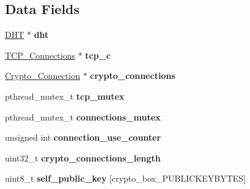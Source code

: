 \subsection*{Data Fields}
\begin{DoxyCompactItemize}
\item 
\hypertarget{struct_net___crypto_a8b3d6ce8745acc52695e252bdb1531b6}{\hyperlink{struct_d_h_t}{D\+H\+T} $\ast$ {\bfseries dht}}\label{struct_net___crypto_a8b3d6ce8745acc52695e252bdb1531b6}

\item 
\hypertarget{struct_net___crypto_a179982a02be89eaf6617ed81bd3c0961}{\hyperlink{struct_t_c_p___connections}{T\+C\+P\+\_\+\+Connections} $\ast$ {\bfseries tcp\+\_\+c}}\label{struct_net___crypto_a179982a02be89eaf6617ed81bd3c0961}

\item 
\hypertarget{struct_net___crypto_a13fdc865b8a114466ba136f5390ec1b2}{\hyperlink{struct_crypto___connection}{Crypto\+\_\+\+Connection} $\ast$ {\bfseries crypto\+\_\+connections}}\label{struct_net___crypto_a13fdc865b8a114466ba136f5390ec1b2}

\item 
\hypertarget{struct_net___crypto_a2e8f7f4dff2f2fc4ac2cc32b0c886974}{pthread\+\_\+mutex\+\_\+t {\bfseries tcp\+\_\+mutex}}\label{struct_net___crypto_a2e8f7f4dff2f2fc4ac2cc32b0c886974}

\item 
\hypertarget{struct_net___crypto_a213135bf3b5b80b1cfe99b27dc42815e}{pthread\+\_\+mutex\+\_\+t {\bfseries connections\+\_\+mutex}}\label{struct_net___crypto_a213135bf3b5b80b1cfe99b27dc42815e}

\item 
\hypertarget{struct_net___crypto_ab5be057850e1cee67902276a69900326}{unsigned int {\bfseries connection\+\_\+use\+\_\+counter}}\label{struct_net___crypto_ab5be057850e1cee67902276a69900326}

\item 
\hypertarget{struct_net___crypto_a9c91c3c65885a2bd39d0f864b9a5ddb9}{uint32\+\_\+t {\bfseries crypto\+\_\+connections\+\_\+length}}\label{struct_net___crypto_a9c91c3c65885a2bd39d0f864b9a5ddb9}

\item 
\hypertarget{struct_net___crypto_ae726df8bdc26380e5a6c3187a00d6881}{uint8\+\_\+t {\bfseries self\+\_\+public\+\_\+key} \mbox{[}crypto\+\_\+box\+\_\+\+P\+U\+B\+L\+I\+C\+K\+E\+Y\+B\+Y\+T\+E\+S\mbox{]}}\label{struct_net___crypto_ae726df8bdc26380e5a6c3187a00d6881}


\end{DoxyCompactItemize}
